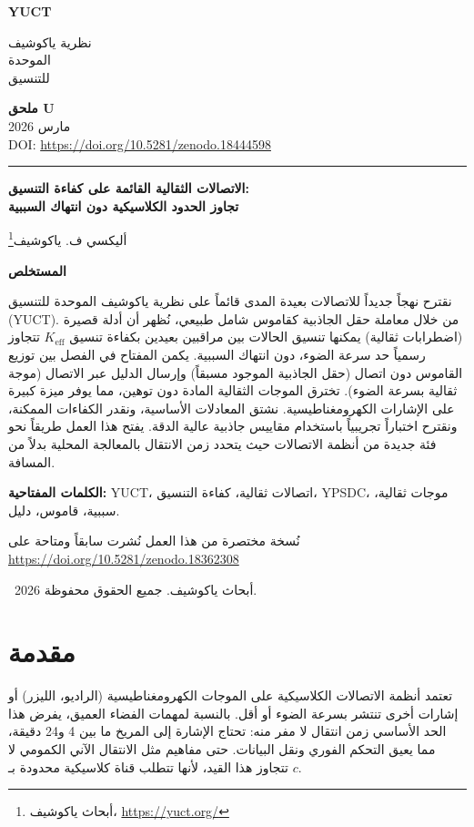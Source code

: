 \documentclass[11pt,a4paper]{article}
\newcommand{\Keff}{K_{\mathrm{eff}}}
\newcommand{\makeheader}{%
	\noindent
	\begin{minipage}{0.17\textwidth}
		\raggedright
		{\sffamily\bfseries\color{skyblue}\fontsize{46}{46}\selectfont YUCT}%
	\end{minipage}%
	\hspace{30pt}
	\begin{minipage}{0.32\textwidth}
		\raggedright
		{\sffamily\fontsize{11}{13}\selectfont نظرية ياكوشيف\\ الموحدة\\ للتنسيق}%
	\end{minipage}%
	\hfill
	\begin{minipage}{0.38\textwidth}
		\raggedleft
		{\sffamily\bfseries ملحق U}\\
		{\sffamily مارس 2026}\\
		{\sffamily\footnotesize DOI: \url{https://doi.org/10.5281/zenodo.18444598}}%
	\end{minipage}
	\par\vspace{5pt}
	\noindent\textcolor{gold}{\rule{\textwidth}{1.6pt}}
	\par\vspace{0pt}
}
\begin{document}
	\thispagestyle{firstpage}
	\makeheader
	
	\vspace{0cm}
	{\LARGE\bfseries الاتصالات الثقالية القائمة على كفاءة التنسيق: \\
		تجاوز الحدود الكلاسيكية دون انتهاك السببية \par}
	\vspace{0.2cm}
	
	{\large أليكسي ف. ياكوشيف\footnote{أبحاث ياكوشيف، \url{https://yuct.org/}}} \\
	\vspace{0.0cm}
	
	{\color{darkblue}\textbf{\LARGE المستخلص}} \par
	{\large
		\noindent
		نقترح نهجاً جديداً للاتصالات بعيدة المدى قائماً على نظرية ياكوشيف الموحدة للتنسيق (YUCT). من خلال معاملة حقل الجاذبية كقاموس شامل طبيعي، نُظهر أن أدلة قصيرة (اضطرابات ثقالية) يمكنها تنسيق الحالات بين مراقبين بعيدين بكفاءة تنسيق \(\Keff\) تتجاوز رسمياً حد سرعة الضوء، دون انتهاك السببية. يكمن المفتاح في الفصل بين توزيع القاموس دون اتصال (حقل الجاذبية الموجود مسبقاً) وإرسال الدليل عبر الاتصال (موجة ثقالية بسرعة الضوء). تخترق الموجات الثقالية المادة دون توهين، مما يوفر ميزة كبيرة على الإشارات الكهرومغناطيسية. نشتق المعادلات الأساسية، ونقدر الكفاءات الممكنة، ونقترح اختباراً تجريبياً باستخدام مقاييس جاذبية عالية الدقة. يفتح هذا العمل طريقاً نحو فئة جديدة من أنظمة الاتصالات حيث يتحدد زمن الانتقال بالمعالجة المحلية بدلاً من المسافة.
	}
	
	\vspace{0.1cm}
	\noindent
	{\color{darkblue}\textbf{الكلمات المفتاحية:}} YUCT، اتصالات ثقالية، كفاءة التنسيق، YPSDC، موجات ثقالية، سببية، قاموس، دليل.
	
	\vspace{0.5cm}
	\noindent
	{\small نُسخة مختصرة من هذا العمل نُشرت سابقاً ومتاحة على \\ \url{https://doi.org/10.5281/zenodo.18362308}}
	\vspace{0.5cm}
	
	\noindent
	\textcopyright\ 2026 أبحاث ياكوشيف. جميع الحقوق محفوظة.
	
	\tableofcontents
	\newpage
	
	\section{مقدمة}
	\label{sec:intro}
	
	تعتمد أنظمة الاتصالات الكلاسيكية على الموجات الكهرومغناطيسية (الراديو، الليزر) أو إشارات أخرى تنتشر بسرعة الضوء أو أقل. بالنسبة لمهمات الفضاء العميق، يفرض هذا الحد الأساسي زمن انتقال لا مفر منه: تحتاج الإشارة إلى المريخ ما بين 4 و24 دقيقة، مما يعيق التحكم الفوري ونقل البيانات. حتى مفاهيم مثل الانتقال الآني الكمومي لا تتجاوز هذا القيد، لأنها تتطلب قناة كلاسيكية محدودة بـ \(c\).
	
\end{document}
